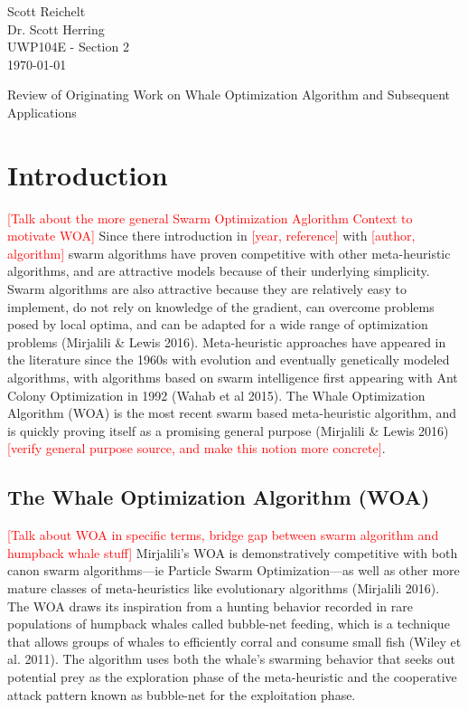 \documentclass[11pt]{article}
\newcommand{\TODO}[1]{\textcolor{red}{[#1]}}
\begin{document}
    \thispagestyle{empty}
    \begin{flushleft}
        Scott Reichelt\\
        Dr. Scott Herring\\
        UWP104E - Section 2\\
        \today\\
    \end{flushleft}
    \vspace{1em}
    \begin{center}
        Review of Originating Work on Whale Optimization Algorithm and Subsequent Applications
    \end{center}

\section*{Introduction}
\TODO{Talk about the more general Swarm Optimization Aglorithm Context to motivate WOA}
Since there introduction in \TODO{year, reference} with \TODO{author, algorithm} swarm algorithms have proven competitive with other meta-heuristic algorithms, and are attractive models because of their underlying simplicity.
Swarm algorithms are also attractive because they are relatively easy to implement, do not rely on knowledge of the gradient, can overcome problems posed by local optima, and can be adapted for a wide range of optimization problems (Mirjalili \& Lewis 2016).
Meta-heuristic approaches have appeared in the literature since the 1960s with evolution and eventually genetically modeled algorithms, with algorithms based on swarm intelligence first appearing with Ant Colony Optimization in 1992 (Wahab et al 2015).
The Whale Optimization Algorithm (WOA) is the most recent swarm based meta-heuristic algorithm, and is quickly proving itself as a promising general purpose (Mirjalili \& Lewis 2016) \TODO{verify general purpose source, and make this notion more concrete}.

\subsection*{The Whale Optimization Algorithm (WOA)}
\TODO{Talk about WOA in specific terms, bridge gap between swarm algorithm and humpback whale stuff}
Mirjalili's WOA is demonstratively competitive with both canon swarm algorithms---ie Particle Swarm Optimization---as well as other more mature classes of meta-heuristics like evolutionary algorithms (Mirjalili 2016).
The WOA draws its inspiration from a hunting behavior recorded in rare populations of humpback whales called bubble-net feeding, which is a technique that allows groups of whales to efficiently corral and consume small fish (Wiley et al. 2011).
The algorithm uses both the whale's swarming behavior that seeks out potential prey as the exploration phase of the meta-heuristic and the cooperative attack pattern known as bubble-net for the exploitation phase.
\end{document}
